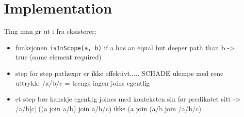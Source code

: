 \chapter{Implementation}
\label{chapter:implementation}

Ting man g\a r ut i fra eksisterer:
\begin{itemize}
\item funksjonen \verb!isInScope(a, b)! if a has an equal but deeper path than b -> true (same element required)
\item step for step pathexpr er ikke effektivt..... SCHADE ulempe med rene uttrykk: /a/b/c = trengs ingen joins egentlig
\item et step b\o r kanskje egentlig joines med konteksten sin f\o r predikatet sitt -> /a/b[c] ((a join a/b) join a/b/c) ikke (a join (a/b join /a/b/c)
\end{itemize}




